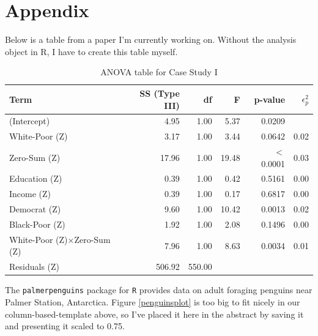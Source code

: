 \documentclass{article}\usepackage[]{graphicx}\usepackage[]{xcolor}
\begin{document}
 \newpage
 \onecolumn
 \section{Appendix}
Below is a table from a paper I’m currently working on. Without the analysis object in R, I have to create this table myself.
\begin{table}[H]
  \begin{center}
    \begin{tabular}{l r r r r r}\hline
      Term & SS (Type III) & df & F & p-value & $\epsilon^2_p$ \\
      \hline
      (Intercept) &4.95 &1.00 & 5.37 &0.0209 \\
      White-Poor (Z) &3.17 &1.00 & 3.44 &0.0642 & 0.02\\
      Zero-Sum (Z) &17.96 &1.00 & 19.48 & $<$ 0.0001 & 0.03\\
      Education (Z) &0.39 &1.00 & 0.42 &0.5161 & 0.00\\
      Income (Z) &0.39 &1.00 & 0.17 &0.6817 & 0.00\\
      Democrat (Z) &9.60 &1.00 & 10.42 &0.0013 & 0.02\\
      Black-Poor (Z) &1.92 &1.00 & 2.08 &0.1496 & 0.00\\
      White-Poor (Z)×Zero-Sum (Z) &7.96 &1.00 & 8.63 &0.0034 & 0.01\\
      Residuals (Z) &506.92 &550.00\\
      \hline
    \end{tabular}
    \caption{ANOVA table for Case Study I}
    \label{manualPlot}
  \end{center}
\end{table}






The \texttt{palmerpenguins} package for \texttt{R} \citep{penguins} provides data on adult foraging penguins near Palmer Station, Antarctica. Figure \ref{penguinsplot} is too big to fit nicely in our column-based-template above, so I’ve placed it here in the abstract by saving it and presenting it scaled to 0.75.
\end{document}
